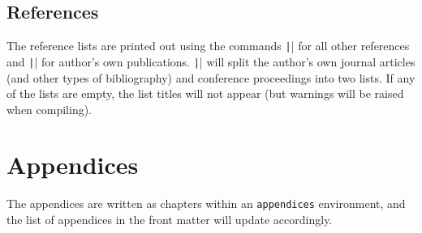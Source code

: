 \documentclass{umalayathesis}
\begin{document}
\subsection{References}

The reference lists are printed out using the commands \texttt|| for all other references and \texttt|\ownreferences| for author's own publications. \texttt|\ownreferences| will split the author's own journal articles (and other types of bibliography) and conference proceedings into two lists. If any of the lists are empty, the list titles will not appear (but warnings will be raised when compiling).

\section{Appendices}

The appendices are written as chapters within an \texttt{appendices} environment, and the list of appendices in the front matter will update accordingly. 

\nocite{*}
\ownreferences
\end{document}
